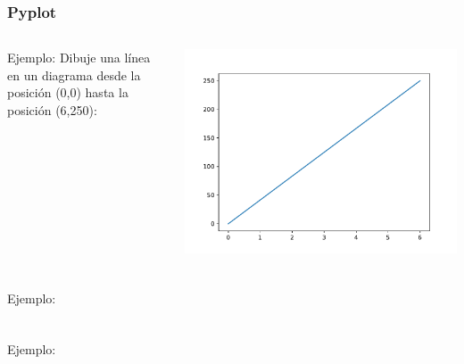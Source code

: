 \begin{frame}[fragile]
  \frametitle{Pyplot}

  \begin{columns}
        \begin{exampleblock}{Ejemplo:}
          Dibuje una línea en un diagrama desde la posición
          (0,0) hasta la posición (6,250):
          
        \end{exampleblock}
      \begin{center}
          \includegraphics[scale=0.5]{ejemplos/e01.pdf}
      \end{center}
  \end{columns}
\end{frame}

\begin{frame}[fragile]
  \frametitle{}

  \begin{exampleblock}{Ejemplo:}
    \begin{lstlisting}[language=Python]
    \end{lstlisting}
  \end{exampleblock}
\end{frame}

\begin{frame}[fragile]
  \frametitle{}

  \begin{exampleblock}{Ejemplo:}
    \begin{lstlisting}[language=Python]
    \end{lstlisting}
  \end{exampleblock}
\end{frame}

